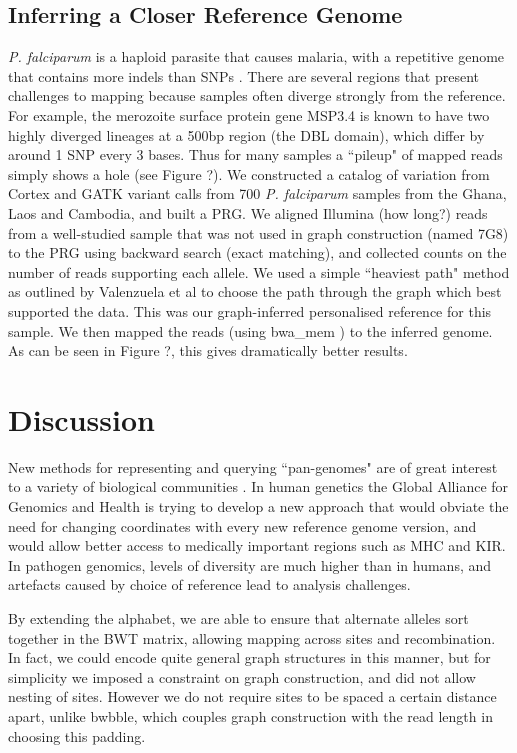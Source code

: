 \documentclass[runningheads,a4paper]{llncs}
\begin{document}
\subsection{Inferring a Closer Reference Genome}
\textit{P. falciparum} is a haploid parasite that causes malaria, with a repetitive genome that contains more indels than SNPs \cite{miles}. There are several regions that present challenges to mapping because samples often diverge strongly from the reference. For example, the merozoite surface protein gene MSP3.4 is known to have two highly diverged lineages at a 500bp region (the DBL domain), which differ by around 1 SNP every 3 bases. Thus for many samples a ``pileup" of mapped reads simply shows a hole (see Figure ?). We constructed a catalog of variation from Cortex \cite{iqbal} and GATK \cite{depristo} variant calls from 700 \textit{P. falciparum} samples from the Ghana, Laos and Cambodia, and built a PRG. We aligned Illumina (how long?) reads from a well-studied sample that was not used in graph construction (named 7G8) to the PRG using backward search (exact matching), and collected counts on the number of reads supporting each allele. We used a simple ``heaviest path" method as outlined by Valenzuela et al \cite{valen} to choose the path through the graph which best supported the data. This was our graph-inferred personalised reference for this sample. We then mapped the reads (using bwa\_mem \cite{hengli}) to the inferred genome. As can be seen in Figure ?,  this gives dramatically better results.


\section{Discussion}
New methods for representing and querying ``pan-genomes" are of great interest to a variety of biological communities \cite{marschall}. In human genetics the Global Alliance for Genomics and Health is trying to develop a new approach that would obviate the need for changing coordinates with every new reference genome version, and would allow better access to medically important regions such as MHC and KIR. In pathogen genomics, levels of diversity are much higher than in humans, and artefacts caused by choice of reference lead to analysis challenges.

By extending the alphabet, we are able to ensure that alternate alleles sort together in the BWT matrix, allowing mapping across sites and recombination. In fact, we could encode quite general graph structures in this manner, but for simplicity we imposed a constraint on graph construction, and did not allow nesting of sites. However we do not require sites to be spaced a certain distance apart, unlike bwbble, which couples graph construction with the read length in choosing this padding.
\end{document}
